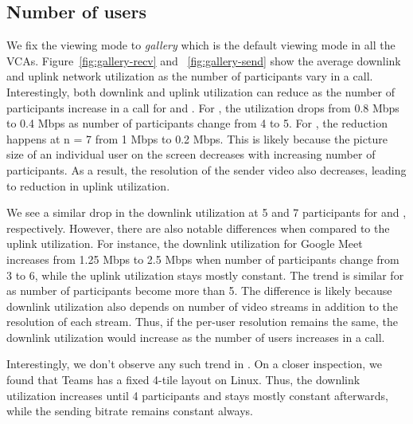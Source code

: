 \subsection{Number of users}
We fix the viewing mode to \textit{gallery} which is the default viewing mode in all the VCAs. Figure~\ref{fig:gallery-recv} and~
\ref{fig:gallery-send} show the average downlink and uplink network utilization as the number of participants vary in a call. Interestingly, both downlink and uplink utilization can reduce as the number of participants increase in a call for \meet and \zoom. For \zoom, the utilization drops from 0.8 Mbps to 0.4 Mbps as number of participants change from 4 to 5. For \meet, the reduction happens at n = 7 from 1 Mbps to  0.2 Mbps. This is likely because the picture size of an individual user on the screen decreases with increasing number of participants. As a result, the resolution of the sender video also decreases, leading to reduction in uplink utilization. 


We see a similar drop in the downlink utilization at 5 and 7 participants for \zoom and \meet, respectively. However, there are also notable differences when compared to the uplink utilization. For instance, the downlink utilization for Google Meet increases from 1.25 Mbps to 2.5 Mbps when number of participants change from 3 to 6, while the uplink utilization stays mostly constant. The trend is similar for \zoom as number of participants become more than 5. The difference is likely because downlink utilization also depends on number of video streams in addition to the resolution of each stream. Thus, if the per-user resolution remains the same, the downlink utilization would increase as the number of users increases in a call.  

Interestingly, we don't observe any such trend in \teams. On a closer inspection, we found that Teams has a fixed 4-tile layout on Linux. Thus, the downlink utilization increases until 4 participants and stays mostly constant afterwards, while the sending bitrate remains constant always. 
 




